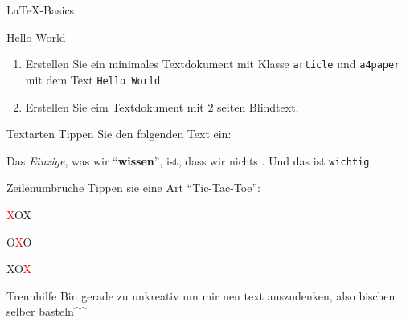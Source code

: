 \documentclass[
    inlineshortcut=java, %
    corporatedesign, %
    boxarc, %
]{algoexercise}
\begin{document}
    \begin{task}[points=auto]{\LaTeX-Basics}
        \begin{subtask*}[points=2]{Hello World}
            \begin{enumerate}
                \item Erstellen Sie ein minimales Textdokument mit Klasse \texttt{article} und \texttt{a4paper} mit dem Text \verb+Hello World+.
                \item Erstellen Sie eim Textdokument mit 2 seiten Blindtext.
            \end{enumerate}
        \end{subtask*}
        \vspace{-2em}
        \begin{subtask*}[points=1]{Textarten}
            Tippen Sie den folgenden Text ein:

            \begin{grayInfoBox}
                \Large Das \emph{Einzige}, \large was wir \enquote{\textbf{wissen}}, ist, \normalsize dass wir \textcolor{\IfDarkModeTF{cyan}{blue}}{nichts} . \small Und das ist \texttt{wichtig}.
            \end{grayInfoBox}
        \end{subtask*}
        \begin{subtask*}[points=1]{Zeilenumbrüche}
            Tippen sie eine Art \enquote{Tic-Tac-Toe}:

            \begin{grayInfoBox}[fontupper=\setlength{\parskip}{0cm}\setlength{\parindent}{0em}, center upper]
                \textcolor{red}{X}\hspace{1cm}O\hspace{1cm}X

                \vspace{1cm}O\hspace{1cm}\textcolor{red}{X}\hspace{1cm}O

                \vspace{1cm}X\hspace{1cm}O\hspace{1cm}\textcolor{red}{X}
            \end{grayInfoBox}
        \end{subtask*}
        \begin{subtask*}[points=1]{Trennhilfe}
            Bin gerade zu unkreativ um mir nen text auszudenken, also bischen selber basteln\^{}\^{}
        \end{subtask*}
    \end{task}
\end{document}
